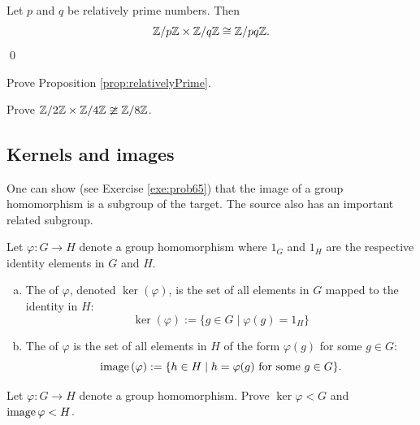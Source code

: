 \documentclass[../algebraNotesMSRI-UP2016.tex]{subfiles}
\begin{document}
\begin{frame}
\begin{prop}\label{prop:relativelyPrime}
Let $p$ and $q$ be relatively prime numbers.  Then
\[
\mathbb Z/p\mathbb Z\times \mathbb Z/q\mathbb Z \cong \mathbb Z/pq\mathbb Z.
\]
\qed
\end{prop}

\smallGap
\begin{exe}\label{exe:relativelyPrime}
Prove Proposition \ref{prop:relativelyPrime}.
\end{exe}

\smallGap
\begin{exe}[cf. Problem 64]\label{exe:prob64}
Prove $\mathbb Z/2\mathbb Z\times \mathbb Z/4\mathbb Z \ncong \mathbb Z/8\mathbb Z$.
\end{exe}
\end{frame}

\subsection[\subsecname]{Kernels and images}\label{subsec:kernelsAndImages}
\begin{frame}{\subsecname}
One can show (see Exercise \ref{exe:prob65}) that the image of a group homomorphism is a subgroup of the target.  The source also has an important related subgroup.      
\begin{dfn}
Let $\varphi:G\to H$ denote a group homomorphism where $1_G$ and $1_H$ are the respective identity elements in $G$ and $H$.
\begin{enumerate}[(a)]
\item The  of $\varphi$, denoted $\ker{(\varphi)}$, is the set of all elements in $G$ mapped to the identity in $H$:
\[
\ker{(\varphi)}:=\{g\in G\mid \varphi(g)=1_H\}
\]
\item The  of $\varphi$ is the set of all elements in $H$ of the form $\varphi(g)$ for some $g\in G$:
\[
\operatorname{image}{(\varphi)}:=\{h\in H\mid h=\varphi(g)\text{ for some $g\in G$}\}.
\]
\end{enumerate}
\end{dfn}
\end{frame}


\begin{frame}[c]
\begin{exe}[cf. Problem 65]\label{exe:prob65}
Let $\varphi:G\to H$ denote a group homomorphism.  Prove $\ker{\varphi}< G$ and $\operatorname{image}{\varphi}< H$.
\end{exe}
\end{frame}
\end{document}
